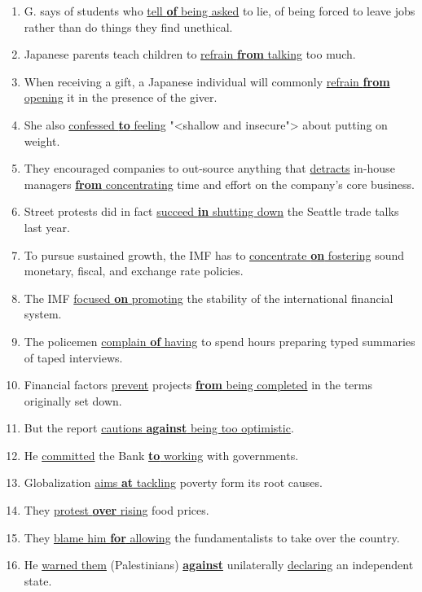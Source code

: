\documentclass[main.tex]{subfiles}
\begin{document}

\begin{enumerate}[nosep,leftmargin=*]
	\itemsep\eitsp
	\item G. says of students who \uline{tell \textbf{of} being asked} to lie, of being forced to leave jobs rather than do things they find unethical.
	\item Japanese parents teach children to \uline{refrain \textbf{from} talking} too much.
	\item When receiving a gift, a Japanese individual will commonly \uline{refrain \textbf{from} opening} it in the presence of the giver.
	\item She also \uline{confessed \textbf{to} feeling} "<shallow and insecure"> about putting on weight.
	\item They encouraged companies to out-source anything that \uline{detracts} in-house managers \uline{\textbf{from} concentrating} time and effort on the company's core business.
	\item Street protests did in fact \uline{succeed \textbf{in} shutting down} the Seattle trade talks last year.
	\item To pursue sustained growth, the IMF has to \uline{concentrate \textbf{on} fostering} sound monetary, fiscal, and exchange rate policies.
	\item The IMF \uline{focused \textbf{on} promoting} the stability of the international financial system.
	\item The policemen \uline{complain \textbf{of} having} to spend hours preparing typed summaries of taped interviews.
	\item Financial factors \uline{prevent} projects \uline{\textbf{from} being completed} in the terms originally set down.
	\item But the report \uline{cautions \textbf{against} being too optimistic}.
	\item He \uline{committed} the Bank \uline{\textbf{to} working} with governments.
	\item Globalization \uline{aims \textbf{at} tackling} poverty form its root causes.
	\item They \uline{protest \textbf{over} rising} food prices.
	\item They \uline{blame him \textbf{for} allowing} the fundamentalists to take over the country.
	\item He \uline{warned them} (Palestinians) \uline{\textbf{against}} unilaterally \uline{declaring} an independent state.

\end{enumerate}
\end{document}
